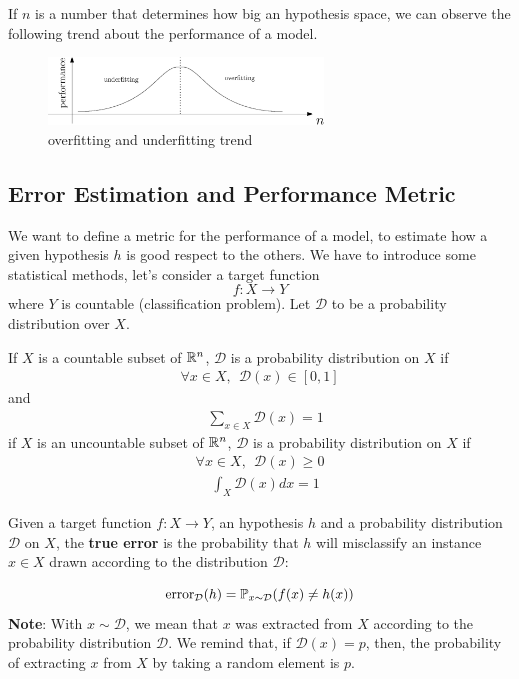 \documentclass[10pt, letterpaper]{report}
\begin{document}
If $n$ is a number that determines how big an hypothesis space, we can observe the following trend about the performance of a model.

\begin{figure}[h!]
    \centering
    \includegraphics[width=0.65\textwidth]{images/fitting.eps}
    \caption{overfitting and underfitting trend}
    \label{img:fitting_trend}
\end{figure}

\subsection{Error Estimation and Performance Metric}
We want to define a metric for the performance of a model, to estimate how a given hypothesis $h$ is good respect to the others. We have to introduce some statistical methods, let's consider a target function\begin{equation}
    f:X\rightarrow Y
\end{equation}
where $Y$ is countable (classification problem). Let $\mathcal D$ to be a probability distribution over $X$.
\begin{definition}\label{def:prob_distr}
    If $X$ is a countable subset of ${\mathbb R}^n$, $\mathcal D$ is a probability distribution on $X$ if\begin{eqnarray}
        \forall x\in X, \ \ \mathcal D(x)\in [0,1]
    \end{eqnarray}
    and \begin{align*}
        &\sum_{x\in X}\mathcal D(x)=1 
    \end{align*}
    if $X$ is an uncountable subset of ${\mathbb R}^n$,  $\mathcal D$ is a probability distribution on $X$ if \begin{eqnarray}
        \forall x\in X, \ \ \mathcal D(x)\ge 0
    \end{eqnarray}
    \begin{align*}
        &\int_X\mathcal D(x)dx=1
    \end{align*}
\end{definition}
\begin{definition}
    Given a target function $f:X\rightarrow Y$, an hypothesis $h$ and a probability distribution $\mathcal D$ on $X$, the \textbf{true error} is the probability that $h$ will misclassify an instance $x\in X$ drawn according to the distribution $\mathcal D$:
    \end{definition}
    \begin{equation}
        \text{error}_{\mathcal D}(h)=
        {\mathbb P}_{x\sim \mathcal D}
        (f(x)\ne h(x)) 
    \end{equation}
\textbf{Note}: With $x\sim \mathcal D$, we mean that $x$ was extracted from $X$ according to the probability distribution $\mathcal D$. We remind that, if $\mathcal D(x)=p$, then, the probability of extracting $x$ from $X$ by taking a random element is $p$.\bigskip
\end{document}
